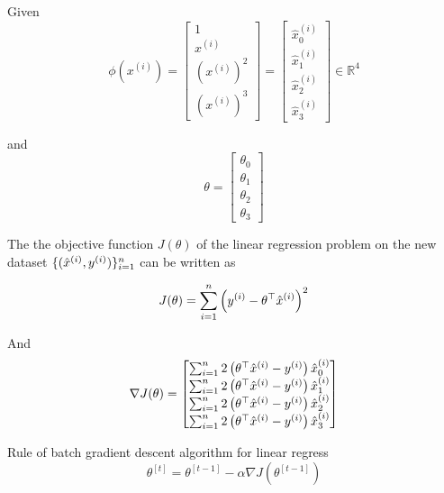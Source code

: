 \begin{answer}

Given 
\begin{equation*}
	\phi(x^{(i)}) = \left[\begin{array}{c} 1\\ x^{(i)} \\ (x^{(i)})^2 \\ (x^{(i)})^3 \end{array}\right] = \left[\begin{array}{c} \hat{x}^{(i)}_0 \\ \hat{x}^{(i)}_1 \\ \hat{x}^{(i)}_2 \\ \hat{x}^{(i)}_3 \end{array}\right] \in \mathbb{R}^4
\end{equation*}

and 
\begin{equation*}
	\theta = \left[\begin{array}{c} \theta_0\\ \theta_1 \\ \theta_2 \\ \theta_3 \end{array}\right]
\end{equation*}

The the objective function $J(\theta)$ of the linear regression problem on the new dataset $\{(\hat{x}^{(i)}, y^{(i)})\}_{i=1}^{{n}}$ can be written as 

\begin{equation*}
	J(\theta) = \sum_{i=1}^{n} \left( y^{(i)} - \theta ^\top \hat{x}^{(i)}\right) ^ 2
\end{equation*}

And 
\begin{equation*}
    \nabla J(\theta) = \left[\begin{matrix}
        \sum_{i=1}^{n} 2 \left( \theta ^\top \hat{x}^{(i)} - y^{(i)}\right) \hat{x}^{(i)}_0 \\
\sum_{i=1}^{n} 2 \left( \theta ^\top \hat{x}^{(i)} - y^{(i)}\right) \hat{x}^{(i)}_1
\\ \sum_{i=1}^{n} 2 \left( \theta ^\top \hat{x}^{(i)} - y^{(i)}\right) \hat{x}^{(i)}_2
 \\ \sum_{i=1}^{n} 2 \left( \theta ^\top \hat{x}^{(i)} - y^{(i)}\right) \hat{x}^{(i)}_3 \end{matrix} \right]
\end{equation*}

Rule of batch gradient descent algorithm for linear regress
\begin{equation*}
	\theta^{[t]} = \theta^{[t-1]} - \alpha\nabla J(\theta^{[t-1]})
\end{equation*}
\end{answer}
